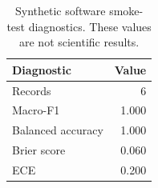 \begin{table}[t]
\centering
\caption{Synthetic software smoke-test diagnostics. These values are not scientific results.}
\label{tab:smoke}
\begin{tabular}{lr}
\toprule
Diagnostic & Value \\
\midrule
Records & 6 \\
Macro-F1 & 1.000 \\
Balanced accuracy & 1.000 \\
Brier score & 0.060 \\
ECE & 0.200 \\
\bottomrule
\end{tabular}
\end{table}
